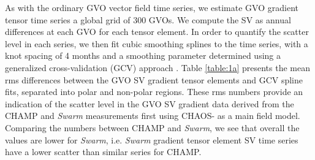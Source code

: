 \documentclass[extra,mreferee]{gji}
\begin{document}
As with the ordinary GVO vector field time series, we estimate GVO gradient tensor time series  a global grid of 300 GVOs. We compute the SV as annual differences at each GVO for each tensor element. In order to quantify the scatter level in each series, we then fit cubic smoothing splines to the time series, with a knot spacing of 4 months and a smoothing parameter determined using a generalized cross-validation (GCV) approach \citep{Green_Silverman_1993}. Table \ref{table:1a} presents the mean rms differences between the GVO SV gradient tensor elements and GCV spline fits, separated into polar and non-polar regions. These rms numbers provide an indication of the scatter level in the GVO SV gradient data derived from the CHAMP and {\it Swarm} measurements first using CHAOS- \citep{Finlay_etal_2020} as a main field model. Comparing the numbers between CHAMP and {\it Swarm}, we see that overall the values are lower for {\it Swarm}, i.e. {\it Swarm} gradient tensor element SV time series have a lower scatter than similar series for CHAMP. 
\end{document}
